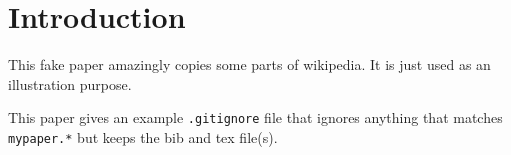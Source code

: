 \section{Introduction}
\label{sec:intro}

This fake paper amazingly copies some parts of wikipedia.
It is just used as an illustration purpose.

This paper gives an example {\tt .gitignore} file that ignores anything that matches {\tt mypaper.*} but keeps the bib and tex file(s).

